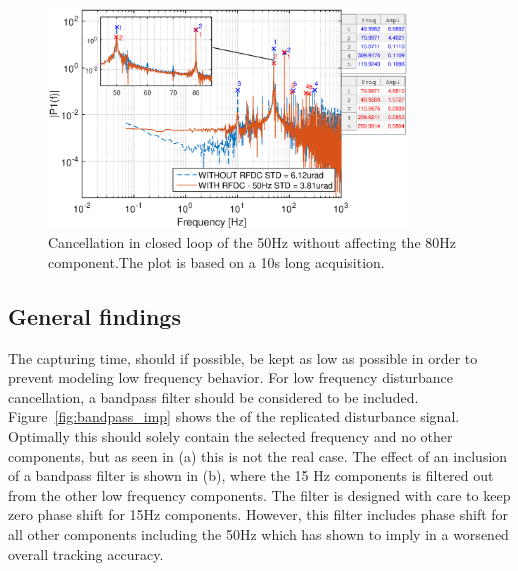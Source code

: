 \begin{figure}[h]
  \centering %
  \includegraphics[width=0.85\textwidth]{fig/matlab/mult_50_selected_closed_loop}
  \caption{\label{fig:mult50no80} Cancellation in closed loop of the 50Hz without affecting the 80Hz component.The plot is based on a 10s long acquisition.}
\end{figure}

\FloatBarrier
\subsection{General findings}\label{subsec:longterm}
The capturing time, should if possible, be kept as low as possible in order to prevent modeling low frequency behavior. For low frequency disturbance cancellation, a bandpass filter should be considered to be included. Figure~\ref{fig:bandpass_imp} shows the \abbrFFT of the replicated disturbance signal. Optimally this should solely contain the selected frequency and no other components, but as seen in (a) this is not the real case. The effect of an inclusion of a bandpass filter is shown in (b), where the 15 Hz components is filtered out from the other low frequency components. The filter is designed with care to keep zero phase shift for 15Hz components. However, this filter includes phase shift for all other components including the 50Hz which has shown to imply in a worsened overall tracking accuracy.

